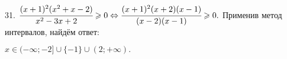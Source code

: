 31. $\cfrac{(x+1)^2(x^2+x-2)}{x^2-3x+2}\geqslant0\Leftrightarrow\cfrac{(x+1)^2(x+2)(x-1)}{(x-2)(x-1)}\geqslant0.$
Применив метод интервалов, найдём ответ:
\begin{figure}[ht!]
\end{figure}
$x\in(-\infty;-2]\cup\{-1\}\cup(2;+\infty).$\\
